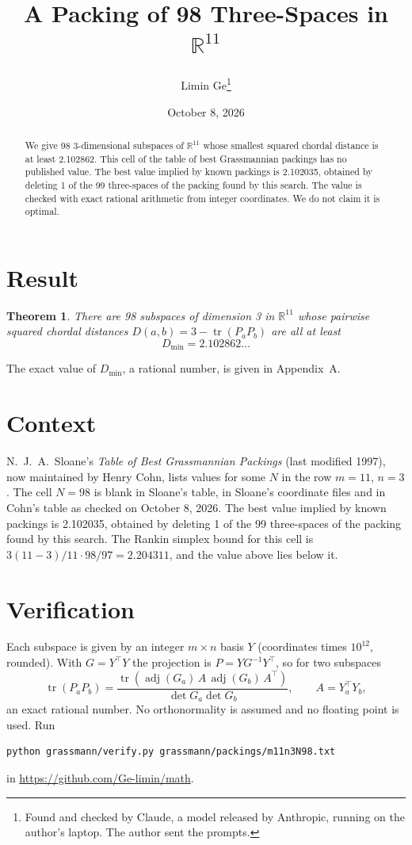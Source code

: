 \documentclass[11pt,a4paper]{article}
\title{A Packing of 98 Three-Spaces in $\mathbb{R}^{11}$}
\author{Limin Ge\thanks{Found and checked by Claude, a model released by Anthropic, running on the author's laptop. The author sent the prompts.}}
\date{October 8, 2026}
\newtheorem*{theorem}{Theorem}
\begin{document}
\maketitle
\begin{abstract}
We give 98 3-dimensional subspaces of $\mathbb{R}^{11}$ whose smallest squared chordal distance is at least 2.102862. This cell of the table of best Grassmannian packings has no published value. The best value implied by known packings is 2.102035, obtained by deleting 1 of the 99 three-spaces of the packing found by this search. The value is checked with exact rational arithmetic from integer coordinates. We do not claim it is optimal.
\end{abstract}

\section{Result}
\begin{theorem}
There are 98 subspaces of dimension 3 in $\mathbb{R}^{11}$ whose pairwise squared chordal distances $D(a,b) = 3 - \operatorname{tr}(P_aP_b)$ are all at least
\[ D_{\min} = 2.102862\ldots \]
\end{theorem}
The exact value of $D_{\min}$, a rational number, is given in Appendix~A.


\section{Context}
N.~J.~A.~Sloane's \emph{Table of Best Grassmannian Packings} (last modified 1997), now maintained by Henry Cohn, lists values for some $N$ in the row $m=11$, $n=3$. The cell $N=98$ is blank in Sloane's table, in Sloane's coordinate files and in Cohn's table as checked on October 8, 2026. The best value implied by known packings is 2.102035, obtained by deleting 1 of the 99 three-spaces of the packing found by this search. The Rankin simplex bound for this cell is $3(11-3)/11\cdot 98/97 = 2.204311$, and the value above lies below it.


\section{Verification}
Each subspace is given by an integer $m\times n$ basis $Y$ (coordinates times $10^{12}$, rounded). With $G=Y^\top Y$ the projection is $P=YG^{-1}Y^\top$, so for two subspaces
\[ \operatorname{tr}(P_aP_b)=\frac{\operatorname{tr}(\operatorname{adj}(G_a)\,A\,\operatorname{adj}(G_b)\,A^\top)}{\det G_a\det G_b},\qquad A=Y_a^\top Y_b, \]
an exact rational number. No orthonormality is assumed and no floating point is used. Run
\begin{verbatim}
python grassmann/verify.py grassmann/packings/m11n3N98.txt
\end{verbatim}
in \url{https://github.com/Ge-limin/math}.
\end{document}
